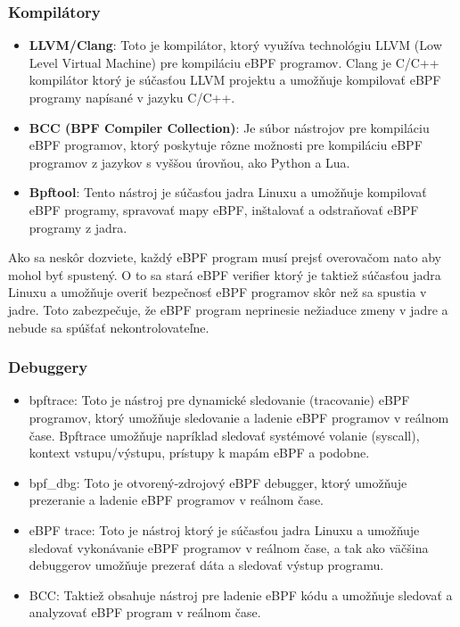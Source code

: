 \subsubsection{Kompilátory}
\begin{itemize}
    \item \textbf{LLVM/Clang}: Toto je kompilátor, ktorý využíva technológiu LLVM (Low Level Virtual Machine) pre kompiláciu eBPF programov. 
    Clang je C/C++ kompilátor ktorý je súčasťou LLVM projektu a umožňuje kompilovať eBPF programy napísané v jazyku C/C++.
    \item \textbf{BCC (BPF Compiler Collection)}: Je súbor nástrojov pre kompiláciu eBPF programov, ktorý poskytuje rôzne možnosti pre kompiláciu eBPF 
    programov z jazykov s vyššou úrovňou, ako Python a Lua.
    \item \textbf{Bpftool}: Tento nástroj je súčasťou jadra Linuxu a umožňuje kompilovať eBPF programy, spravovať mapy eBPF, 
    inštalovať a odstraňovať eBPF programy z jadra.
\end{itemize}
Ako sa neskôr dozviete, každý eBPF program musí prejsť overovačom  nato aby mohol byť spustený. O to sa stará eBPF verifier 
ktorý je taktiež súčasťou jadra Linuxu a umožňuje overiť bezpečnosť eBPF programov skôr než sa spustia v jadre. 
Toto zabezpečuje, že eBPF program neprinesie nežiaduce zmeny v jadre a nebude sa spúšťať nekontrolovateľne.

\subsubsection{Debuggery}
\begin{itemize}
    \item bpftrace: Toto je nástroj pre dynamické sledovanie (tracovanie) eBPF programov, ktorý umožňuje sledovanie a ladenie 
    eBPF programov v reálnom čase. Bpftrace umožňuje napríklad sledovať systémové volanie (syscall), kontext vstupu/výstupu, 
    prístupy k mapám eBPF a podobne.
    \item bpf\_dbg: Toto je otvorený-zdrojový eBPF debugger, ktorý umožňuje prezeranie a ladenie eBPF programov v reálnom čase.
    \item eBPF trace: Toto je nástroj ktorý je súčasťou jadra Linuxu a umožňuje sledovať vykonávanie  eBPF programov v reálnom čase, 
    a tak ako väčšina debuggerov umožňuje prezerať dáta a sledovať výstup programu.
    \item BCC: Taktiež obsahuje nástroj pre ladenie eBPF kódu a umožňuje sledovať a analyzovať eBPF program v reálnom čase.
\end{itemize}

